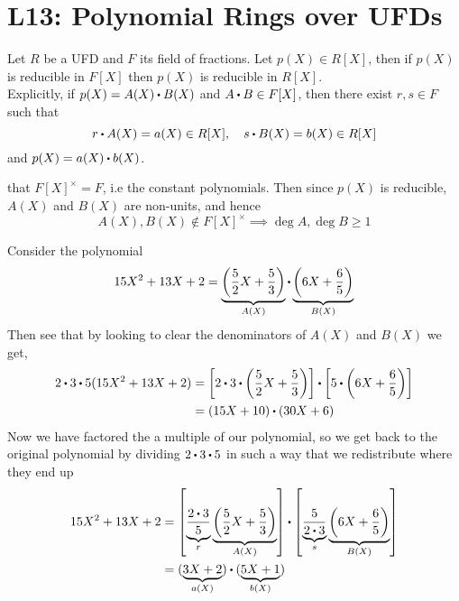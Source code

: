 \documentclass[../Main.tex]{subfiles}
\begin{document}
\chapter{L13: Polynomial Rings over UFDs}

\begin{lem}[title = Gauss's Lemma,label=gauss]
	Let $R$ be a UFD and $F$ its field of fractions. Let $p(X)\in R[X]$, then if $p(X)$ is reducible in $F[X]$ then $p(X)$ is reducible in $R[X]$.\\
	Explicitly, if $p(X)=A(X)\rdot B(X)$ and $A\rdot B\in F[X]$, then there exist $r,s\in F$ such that 
	\[r\rdot A(X) = a(X)\in R[X],\quad s\rdot B(X) = b(X) \in R[X]\]
	and $p(X) = a(X)\rdot b(X)$.
\end{lem}
\Obs that $F[X]^\times = F$, i.e the constant polynomials. Then since $p(X)$ is reducible, $A(X)$ and $B(X)$ are non-units, and hence
\[A(X),B(X) \notin F[X]^\times \implies \deg A, \deg B \ge 1\]
\begin{example}
	Consider the polynomial
	\[15X^2+13X+2 = \underbrace{\left(\frac{5}{2}X + \frac{5}{3}\right)}_{A(X)}\rdot  \underbrace{\left(6X + \frac{6}{5}\right)}_{B(X)}\]
	Then see that by looking to clear the denominators of $A(X)$ and $B(X)$ we get,
	\begin{align*}
	2\rdot 3\rdot 5(15X^2+13X+2) &= \left[2\rdot 3 \rdot \left(\frac{5}{2}X + \frac{5}{3}\right) \right] \rdot  \left[5\rdot \left(6X + \frac{6}{5}\right)\right] \\
	&= (15X+10) \rdot{}  (30X+6)
	\end{align*}
	Now we have factored the a multiple of our polynomial, so we get back to the original polynomial by dividing $2\rdot 3\rdot 5$ in such a way that we redistribute where they end up
	\begin{align*}
	15X^2+13X+2&=\left[\underbrace{\frac{2\rdot 3}{5}}_{r}\underbrace{\left(\frac{5}{2}X + \frac{5}{3}\right)}_{A(X)}\right]\rdot \left[\underbrace{\frac{5}{2\rdot 3}}_{s} \underbrace{\left(6X + \frac{6}{5}\right)}_{B(X)}\right]\\
	&= (\underbrace{3X+2}_{a(X)})\rdot{}  (\underbrace{5X+1}_{b(X)})
	\end{align*}
\end{example}	
\end{document}
